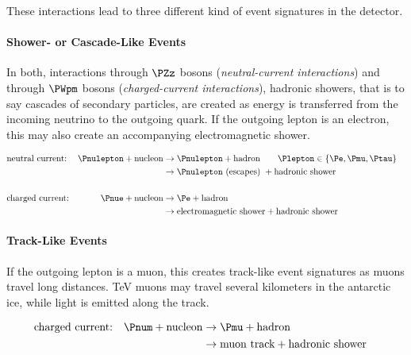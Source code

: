 These interactions lead to three different kind of event signatures in the \icecube detector.

\paragraph{Shower- or Cascade-Like Events}
In both, interactions through $\PZz$ bosons (\textit{neutral-current interactions}) and through $\PWpm$ bosons (\textit{charged-current interactions}), hadronic showers, that is to say cascades of secondary particles, are created as energy is transferred from the incoming neutrino to the outgoing quark. If the outgoing lepton is an electron, this may also create an accompanying electromagnetic shower. \cite{energyreco}

\begin{align*}
  & \text{neutral current:} & \Pnulepton + \text{nucleon} & \rightarrow \Pnulepton + \text{hadron} \ \ \ \ \ \ \Plepton \in \{ \Pe, \Pmu, \Ptau \}                             & \\
  &                         &                             & \rightarrow \Pnulepton \text{ (escapes) } + \text{hadronic shower}  & \\ \\
  & \text{charged current:} & \Pnue + \text{nucleon}      & \rightarrow \Pe + \text{hadron}                                     & \\
  &                         &                             & \rightarrow \text{electromagnetic shower} + \text{hadronic shower}  & \\
\end{align*}

\paragraph{Track-Like Events}
If the outgoing lepton is a muon, this creates track-like event signatures as muons travel long distances. TeV muons may travel several kilometers in the antarctic ice, while light is emitted along the track. \cite{skysearch, mmc}

\begin{align*}
  & \text{charged current:} & \Pnum + \text{nucleon}      & \rightarrow \Pmu + \text{hadron}                                    & \\
  &                         &                             & \rightarrow \text{muon track} + \text{hadronic shower}              & \\
\end{align*}

